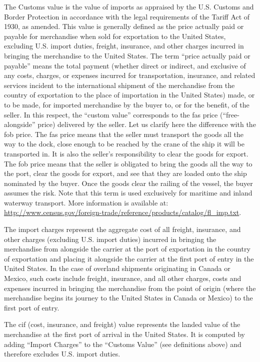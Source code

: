 \documentclass[a4paper,11pt]{article}
\begin{document}
The Customs value is the value of imports as appraised by the U.S.
Customs and Border Protection in accordance with the legal requirements of the Tariff Act of 1930, as amended.
This value is generally defined as the price actually paid or payable for merchandise when sold for exportation to the United States, excluding U.S.
import duties, freight, insurance, and other charges incurred in bringing the merchandise to the United States.
The term ``price actually paid or payable'' means the total payment (whether direct or indirect, and exclusive of any costs, charges, or expenses incurred for transportation, insurance, and related services incident to the international shipment of the merchandise from the country of exportation to the place of importation in the United States) made, or to be made, for imported merchandise by the buyer to, or for the benefit, of the seller.
In this respect, the ``custom value'' corresponds to the fas price (``free-alongside'' price) delivered by the seller. Let us clarify here the difference with the fob price. The fas price means that the seller must transport the goods all the way to the dock, close enough to be reached by the crane of the ship it will be transported in. It is also the seller's responsibility to clear the goods for export. The fob price means that the seller is obligated to bring the goods all the way to the port, clear the goods for export, and see that they are loaded onto the ship nominated by the buyer. Once the goods clear the railing of the vessel, the buyer assumes the risk. Note that this term is used exclusively for maritime and inland waterway transport. More information is available at: \url{http://www.census.gov/foreign-trade/reference/products/catalog/fl_imp.txt}. \smallskip

The import charges represent the aggregate cost of all freight, insurance, and other charges (excluding U.S.
import duties) incurred in bringing the merchandise from alongside the carrier at the port of exportation in the country of exportation and placing it alongside the carrier at the first port of entry in the United States.
In the case of overland shipments originating in Canada or Mexico, such costs include freight, insurance, and all other charges, costs and expenses incurred in bringing the merchandise from the point of origin (where the merchandise begins its journey to the United States in Canada or Mexico) to the first port of entry.

The cif (cost, insurance, and freight) value represents the landed value of the merchandise at the first port of arrival in the United States.
It is computed by adding ``Import Charges'' to the ``Customs Value'' (see definitions above) and therefore excludes U.S.
import duties.
\end{document}
